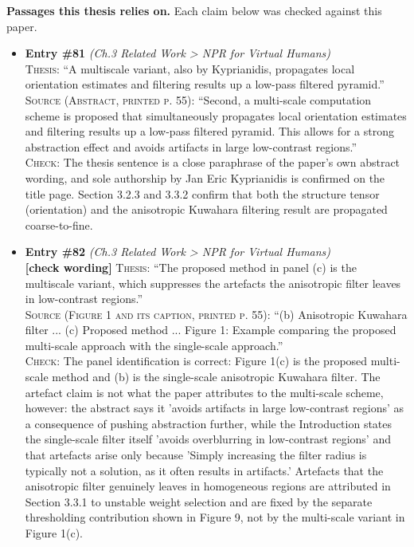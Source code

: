 \documentclass[11pt, a4paper]{article}
\begin{document}
\textbf{Passages this thesis relies on.} Each claim below was checked against this paper.
\begin{itemize}[leftmargin=1.2em,itemsep=4pt]
\item \textbf{Entry \#81} \textit{(Ch.3 Related Work > NPR for Virtual Humans)}\\
\textsc{Thesis:} ``A multiscale variant, also by Kyprianidis, propagates local orientation estimates and filtering results up a low-pass filtered pyramid.''\\
\textsc{Source (Abstract, printed p. 55):} ``Second, a multi-scale computation scheme is proposed that simultaneously propagates local orientation estimates and filtering results up a low-pass filtered pyramid. This allows for a strong abstraction effect and avoids artifacts in large low-contrast regions.''\\
\textsc{Check:} The thesis sentence is a close paraphrase of the paper's own abstract wording, and sole authorship by Jan Eric Kyprianidis is confirmed on the title page. Section 3.2.3 and 3.3.2 confirm that both the structure tensor (orientation) and the anisotropic Kuwahara filtering result are propagated coarse-to-fine.
\item \textbf{Entry \#82} \textit{(Ch.3 Related Work > NPR for Virtual Humans)}\\
\textcolor{partialorange}{\textbf{[check wording]}} \textsc{Thesis:} ``The proposed method in panel (c) is the multiscale variant, which suppresses the artefacts the anisotropic filter leaves in low-contrast regions.''\\
\textsc{Source (Figure 1 and its caption, printed p. 55):} ``(b) Anisotropic Kuwahara filter ... (c) Proposed method ... Figure 1: Example comparing the proposed multi-scale approach with the single-scale approach.''\\
\textsc{Check:} The panel identification is correct: Figure 1(c) is the proposed multi-scale method and (b) is the single-scale anisotropic Kuwahara filter. The artefact claim is not what the paper attributes to the multi-scale scheme, however: the abstract says it 'avoids artifacts in large low-contrast regions' as a consequence of pushing abstraction further, while the Introduction states the single-scale filter itself 'avoids overblurring in low-contrast regions' and that artefacts arise only because 'Simply increasing the filter radius is typically not a solution, as it often results in artifacts.' Artefacts that the anisotropic filter genuinely leaves in homogeneous regions are attributed in Section 3.3.1 to unstable weight selection and are fixed by the separate thresholding contribution shown in Figure 9, not by the multi-scale variant in Figure 1(c).
\end{itemize}
\end{document}
